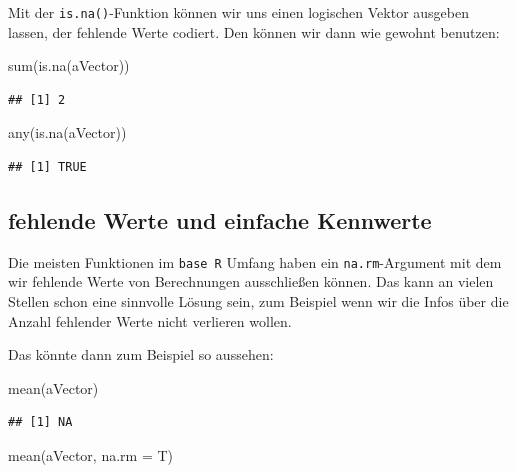 \documentclass[
]{book}
\newenvironment{Shaded}{\begin{snugshade}}{\end{snugshade}}
\newcommand{\AttributeTok}[1]{\textcolor[rgb]{0.77,0.63,0.00}{#1}}
\newcommand{\FunctionTok}[1]{\textcolor[rgb]{0.00,0.00,0.00}{#1}}
\newcommand{\NormalTok}[1]{#1}
\begin{document}
Mit der \texttt{is.na()}-Funktion können wir uns einen logischen Vektor ausgeben lassen, der fehlende Werte codiert. Den können wir dann wie gewohnt benutzen:

\begin{Shaded}
\begin{Highlighting}[]
\FunctionTok{sum}\NormalTok{(}\FunctionTok{is.na}\NormalTok{(aVector))}
\end{Highlighting}
\end{Shaded}

\begin{verbatim}
## [1] 2
\end{verbatim}

\begin{Shaded}
\begin{Highlighting}[]
\FunctionTok{any}\NormalTok{(}\FunctionTok{is.na}\NormalTok{(aVector))}
\end{Highlighting}
\end{Shaded}

\begin{verbatim}
## [1] TRUE
\end{verbatim}

\hypertarget{fehlende-werte-und-einfache-kennwerte}{%
\subsection{fehlende Werte und einfache Kennwerte}\label{fehlende-werte-und-einfache-kennwerte}}

Die meisten Funktionen im \texttt{base\ R} Umfang haben ein \texttt{na.rm}-Argument mit dem wir fehlende Werte von Berechnungen ausschließen können. Das kann an vielen Stellen schon eine sinnvolle Lösung sein, zum Beispiel wenn wir die Infos über die Anzahl fehlender Werte nicht verlieren wollen.

Das könnte dann zum Beispiel so aussehen:

\begin{Shaded}
\begin{Highlighting}[]
\FunctionTok{mean}\NormalTok{(aVector)}
\end{Highlighting}
\end{Shaded}

\begin{verbatim}
## [1] NA
\end{verbatim}

\begin{Shaded}
\begin{Highlighting}[]
\FunctionTok{mean}\NormalTok{(aVector, }\AttributeTok{na.rm =}\NormalTok{ T)}
\end{Highlighting}
\end{Shaded}
\end{document}
